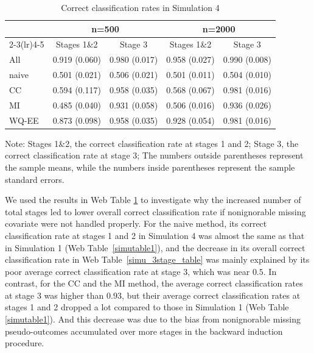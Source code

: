 \documentclass[12pt]{article}
\begin{document}
\begin{table}[htbp]
  \centering
  \caption{Correct classification rates in Simulation 4}
  \begin{threeparttable}
    \begin{tabular}{lcccc}
    \hline
          & \multicolumn{2}{c}{n=500}     & \multicolumn{2}{c}{n=2000} \\
          \cmidrule(lr){2-3}\cmidrule(lr){4-5}
          & Stages 1\&2 & Stage 3 & Stages 1\&2 & Stage 3 \\
          \hline
All & 0.919  (0.060) & 0.980  (0.017) & 0.958  (0.027) & 0.990  (0.008) \\
naive & 0.501  (0.021) & 0.506  (0.021) & 0.501  (0.011) & 0.504  (0.010) \\
CC & 0.594  (0.117) & 0.958  (0.035) & 0.568  (0.067) & 0.981  (0.016) \\
MI & 0.485  (0.040) & 0.931  (0.058) & 0.506  (0.016) & 0.936  (0.026) \\
WQ-EE &0.873  (0.098) & 0.958  (0.035) & 0.928  (0.054) & 0.981  (0.016) \\
    \hline
    \end{tabular}%
\begin{tablenotes}
    \small
    \item Note: Stages 1\&2, the correct classification rate at stages 1 and 2; Stage 3, the correct classification rate at stage 3; The numbers outside parentheses represent the sample means, while the numbers inside parentheses represent the sample standard errors.
\end{tablenotes}
  \end{threeparttable}
  \label{simu_3stage_table2}%
\end{table}%

We used the results in  Web Table \ref{simu_3stage_table2} to investigate why    the increased number of total stages  led to  lower overall correct classification rate if nonignorable missing covariate were  not handled properly. For the naive method, its correct classification rate at stages 1 and 2 in Simulation 4 was almost the same as that in Simulation 1 (Web Table~\ref{simutable1}), and the decrease in its overall correct classification rate in Web Table~\ref{simu_3stage_table} was mainly explained by its poor average correct classification rate  at stage 3, which was near $0.5$. In contrast,  for the CC and the MI method, the average correct classification rates at stage 3 was higher than $0.93$, but their average correct classification rates at stages 1 and 2 dropped a lot compared to those in Simulation 1  (Web Table \ref{simutable1}). And this decrease was due to the bias from nonignorable missing pseudo-outcomes accumulated over more stages in the backward induction procedure.     
\end{document}
